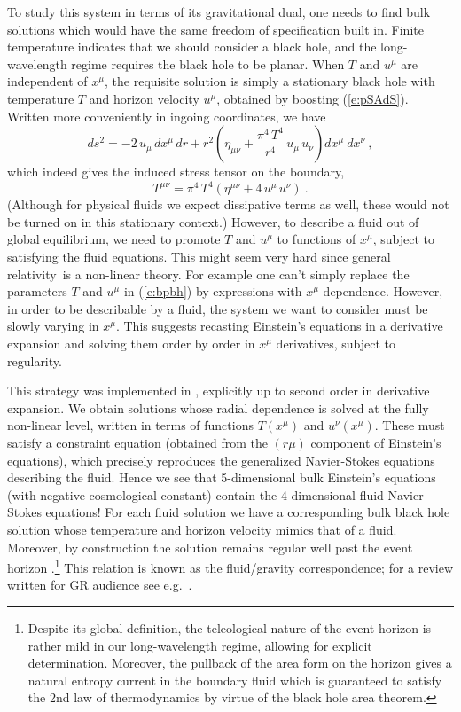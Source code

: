 \documentclass[12pt,a4paper]{article}
\def\req#1{(\ref{#1})}
\def\GR{general relativity}
\begin{document}
 To study this system in terms of its gravitational dual, one needs to find  bulk solutions which would have the same freedom of specification built in.  Finite temperature indicates that we should consider a black hole, and the long-wavelength regime requires the black hole to be planar.  When $T$ and $u^\mu$ are independent of $x^\mu$, the requisite solution is simply a stationary black hole with temperature $T$ and horizon velocity $u^\mu$, obtained by boosting \req{e:pSAdS}.  Written more conveniently in ingoing coordinates, we have
\begin{equation}
ds^2 = -2 \, u_\mu \, dx^\mu \, dr + r^2 \left(\eta_{\mu\nu} +\frac{\pi^4 \, T^4}{r^4} \, u_\mu \, u_\nu \right) dx^\mu \ dx^\nu \ ,
\label{e:bpbh}
\end{equation}	
%
 which indeed gives the induced stress tensor on the boundary,
\begin{equation}
T^{\mu\nu} = \pi^4 \, T^4 \left( \eta^{\mu\nu} + 4 \, u^\mu \, u^\nu \right)
\ .
\label{}
\end{equation}	
%
(Although for physical fluids we expect dissipative terms as well, these would not be turned on in this stationary context.)
However, to describe a fluid out of global equilibrium, we need to promote $T$ and $u^\mu$ to functions of $x^\mu$, subject to satisfying the fluid equations.  This might seem very hard since \GR\ is a non-linear theory.  For example one can't simply replace  the parameters $T$ and  $u^\mu$ in \req{e:bpbh} by expressions with $x^\mu$-dependence.  However, in order to be describable by a fluid, the system we want to consider must be slowly varying in $x^\mu$.  This suggests recasting Einstein's equations in a derivative expansion and solving them order by order in $x^{\mu}$ derivatives, subject to regularity.  

This strategy was implemented  in  \cite{Bhattacharyya:2008jc}, explicitly up to second order in derivative expansion.  We obtain solutions whose radial dependence is solved at the fully non-linear level, written in terms of functions $T(x^\mu)$ and $u^\nu(x^\mu)$.  These must satisfy a constraint equation (obtained from the $(r \mu)$ component of Einstein's equations), which precisely reproduces the generalized Navier-Stokes equations describing the fluid.  Hence we see that 5-dimensional bulk Einstein's equations (with negative cosmological constant) contain the 4-dimensional fluid Navier-Stokes equations!  For each fluid solution we  have  a corresponding bulk black hole solution whose temperature and  horizon velocity mimics that of a fluid.  Moreover, by construction the solution remains regular well past the event horizon \cite{Bhattacharyya:2008xc}.\footnote{
Despite its global definition, the teleological nature of the event horizon is rather mild in our long-wavelength regime, allowing for explicit determination.  Moreover, the pullback of the area form on the horizon gives a natural entropy current in the boundary fluid which is guaranteed to  satisfy the 2nd law of thermodynamics by virtue of the black hole area theorem.
}  This relation is known as the fluid/gravity correspondence; for a review written for GR audience see e.g.\ \cite{Hubeny:2011hd,Hubeny:2010wp}.
\end{document}
